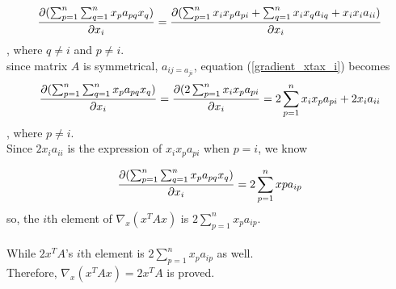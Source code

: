 \documentclass[12pt]{article}
\begin{document}
\begin{equation}\label{gradient_xtax_i}
	\frac{\partial(\sum_{p=1}^n \sum_{q=1}^n x_pa_{pq}x_q)}{\partial x_i} \\
	=\frac{\partial(\sum_{p=1}^n x_ix_pa_{pi}+\sum_{q=1}^n x_ix_qa_{iq}+x_ix_ia_{ii})}{\partial x_i}
\end{equation}
, where $q\neq i$ and $p\neq i$.
\\
since matrix $A$ is symmetrical, $a_{ij=a_{ji}}$, equation (\ref{gradient_xtax_i}) becomes
\begin{equation}\label{gradient_xtax_i_mod}
	\frac{\partial(\sum_{p=1}^n \sum_{q=1}^n x_pa_{pq}x_q)}{\partial x_i} \\
	=\frac{\partial(2\sum_{p=1}^n x_ix_pa_{pi}}{\partial x_i}=2\sum_{p=1}^n x_ix_pa_{pi}+2x_ia_{ii}
\end{equation}
, where $p\neq i$.\\
Since $2x_ia_{ii}$ is the expression of $x_ix_pa_{pi}$ when $p=i$, we know

\begin{equation}\label{gradient_xtax_i_final}
	\frac{\partial(\sum_{p=1}^n \sum_{q=1}^n x_pa_{pq}x_q)}{\partial x_i} \\
	=2\sum_{p=1}^n xpa_{ip}
\end{equation}
so, the $i$th element of $\nabla_x(x^TAx)$ is $2\sum_{p=1}^n x_pa_{ip}$.\\
\\
\noindent
While $2x^TA$'s $i$th element is $2\sum_{p=1}^n x_pa_{ip}$ as well.\\
Therefore, $\nabla_x(x^TAx)=2x^TA$ is proved.

\end{document}
